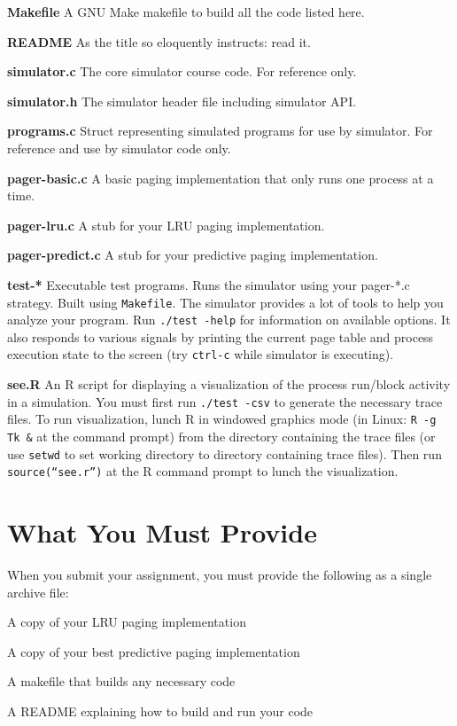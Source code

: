 \documentclass[12pt]{article}
\newenvironment{packed_enum}{
\begin{enumerate}
  \setlength{\itemsep}{1pt}
  \setlength{\parskip}{0pt}
  \setlength{\parsep}{0pt}
}{\end{enumerate}}
\begin{document}
\begin{packed_enum}
\item {\bf Makefile} A GNU Make makefile to build all the code listed
  here.
\item {\bf README} As the title so eloquently instructs: read it.
\item {\bf simulator.c} The core simulator course code. For reference
  only.
\item {\bf simulator.h} The simulator header file including simulator
  API.
\item {\bf programs.c} Struct representing simulated programs for use
  by simulator. For reference and use by simulator code only.
\item {\bf pager-basic.c} A basic paging implementation that only runs
  one process at a time.
\item {\bf pager-lru.c} A stub for your LRU paging implementation.
\item {\bf pager-predict.c} A stub for your predictive paging implementation.
\item {\bf test-*} Executable test programs. Runs the simulator using
  your pager-*.c strategy. Built using \texttt{Makefile}. The simulator
  provides a lot of tools to help you analyze your program.
  Run \texttt{./test -help} for information on available options. It
  also responds to various signals by printing the current page table
  and process execution state to the screen (try \texttt{ctrl-c} while
  simulator is executing).
\item {\bf see.R} An R script for displaying a visualization of the
  process run/block activity in a simulation.
  You must first run \texttt{./test -csv} to
  generate the necessary trace files. To run visualization, lunch R in
  windowed graphics mode (in Linux: \texttt{R -g Tk \&} at the command
  prompt) from the directory containing the trace
  files (or use \texttt{setwd} to set working directory to directory
  containing trace files). Then run \texttt{source(``see.r'')} at the R
  command prompt to lunch the visualization.
\end{packed_enum}

\section{What You Must Provide}

When you submit your assignment, you must provide the following as a
single archive file:
\begin{packed_enum}
\item A copy of your LRU paging implementation
\item A copy of your best predictive paging implementation
\item A makefile that builds any necessary code
\item A README explaining how to build and run your code
\end{packed_enum}
\end{document}
